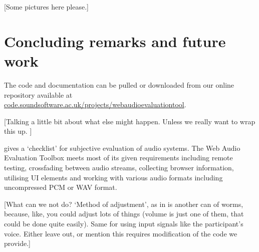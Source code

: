 \documentclass{sig-alternate}
\begin{document}
	[Some pictures here please.]
\section{Concluding remarks and future work}
\label{sec:conclusion}
	
	The code and documentation can be pulled or downloaded from our online repository available at \url{code.soundsoftware.ac.uk/projects/webaudioevaluationtool}.
	
	[Talking a little bit about what else might happen. Unless we really want to wrap this up. ]
	
	\cite{schoeffler2015mushra} gives a `checklist' for subjective evaluation of audio systems. The Web Audio Evaluation Toolbox meets most of its given requirements including remote testing, crossfading between audio streams, collecting browser information, utilising UI elements and working with various audio formats including uncompressed PCM or WAV format.

	[What can we not do? `Method of adjustment', as in \cite{schoeffler2015mushra} is another can of worms, because, like, you could adjust lots of things (volume is just one of them, that could be done quite easily). Same for using input signals like the participant's voice. Either leave out, or mention this requires modification of the code we provide.]

%

%
%
\end{document}
